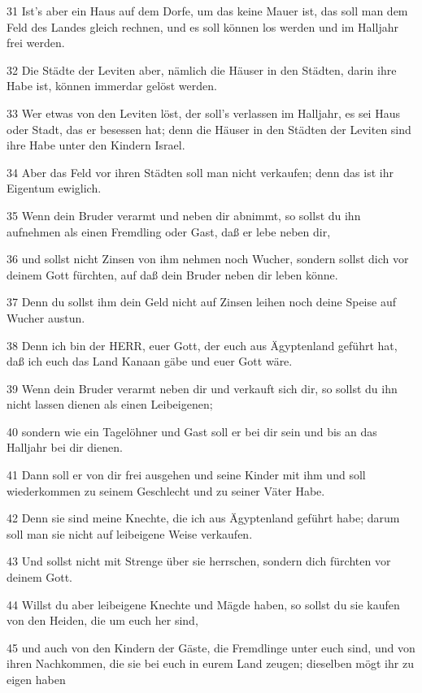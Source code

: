 \par 31 Ist's aber ein Haus auf dem Dorfe, um das keine Mauer ist, das soll man dem Feld des Landes gleich rechnen, und es soll können los werden und im Halljahr frei werden.
\par 32 Die Städte der Leviten aber, nämlich die Häuser in den Städten, darin ihre Habe ist, können immerdar gelöst werden.
\par 33 Wer etwas von den Leviten löst, der soll's verlassen im Halljahr, es sei Haus oder Stadt, das er besessen hat; denn die Häuser in den Städten der Leviten sind ihre Habe unter den Kindern Israel.
\par 34 Aber das Feld vor ihren Städten soll man nicht verkaufen; denn das ist ihr Eigentum ewiglich.
\par 35 Wenn dein Bruder verarmt und neben dir abnimmt, so sollst du ihn aufnehmen als einen Fremdling oder Gast, daß er lebe neben dir,
\par 36 und sollst nicht Zinsen von ihm nehmen noch Wucher, sondern sollst dich vor deinem Gott fürchten, auf daß dein Bruder neben dir leben könne.
\par 37 Denn du sollst ihm dein Geld nicht auf Zinsen leihen noch deine Speise auf Wucher austun.
\par 38 Denn ich bin der HERR, euer Gott, der euch aus Ägyptenland geführt hat, daß ich euch das Land Kanaan gäbe und euer Gott wäre.
\par 39 Wenn dein Bruder verarmt neben dir und verkauft sich dir, so sollst du ihn nicht lassen dienen als einen Leibeigenen;
\par 40 sondern wie ein Tagelöhner und Gast soll er bei dir sein und bis an das Halljahr bei dir dienen.
\par 41 Dann soll er von dir frei ausgehen und seine Kinder mit ihm und soll wiederkommen zu seinem Geschlecht und zu seiner Väter Habe.
\par 42 Denn sie sind meine Knechte, die ich aus Ägyptenland geführt habe; darum soll man sie nicht auf leibeigene Weise verkaufen.
\par 43 Und sollst nicht mit Strenge über sie herrschen, sondern dich fürchten vor deinem Gott.
\par 44 Willst du aber leibeigene Knechte und Mägde haben, so sollst du sie kaufen von den Heiden, die um euch her sind,
\par 45 und auch von den Kindern der Gäste, die Fremdlinge unter euch sind, und von ihren Nachkommen, die sie bei euch in eurem Land zeugen; dieselben mögt ihr zu eigen haben
